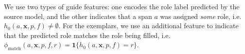 \documentclass[11pt,a4paper]{article}
\newcommand{\exemplars}{\mathrm{ex}}
\newcommand{\fulltext}{\mathrm{ft}}
\newcommand{\ensuretext}[1]{#1}
\newcommand{\nssmarker}{\ensuretext{\textcolor{magenta}{\ensuremath{^{\textsc{NS}}_{\textsc{S}}}}}}
\newcommand{\mkmarker}{\ensuretext{\textcolor{red}{\ensuremath{^{\textsc{M}}_{\textsc{K}}}}}}
\newcommand{\stmarker}{\ensuretext{\textcolor{blue}{\ensuremath{^{\textsc{S}}_{\textsc{T}}}}}}
\newcommand{\arkcomment}[3]{\ensuretext{\textcolor{#3}{[#1 #2]}}}
\newcommand{\nss}[1]{\arkcomment{\nssmarker}{#1}{magenta}}
\newcommand{\mk}[1]{\arkcomment{\mkmarker}{#1}{red}}
\newcommand{\st}[1]{\arkcomment{\stmarker}{#1}{blue}}
\newcommand{\x}{\mathbf{x}}
\begin{document}
We use two types of guide features:
one encodes the role label predicted by the source model,
and the other indicates that a span $a$ was assigned \emph{some} role, 
i.e.~$h_0(a,\mathbf{x},p,f)\neq\emptyset$.
For the exemplars, %
we use an additional feature to indicate that 
the predicted role matches the role being filled, 
i.e.~$\phi_{\text{match}}(a,\mathbf{x},p,f,r) = \mathbf{1}\{h_0(a,\mathbf{x},p,f)=r\}$.


% 
% 
\end{document}

